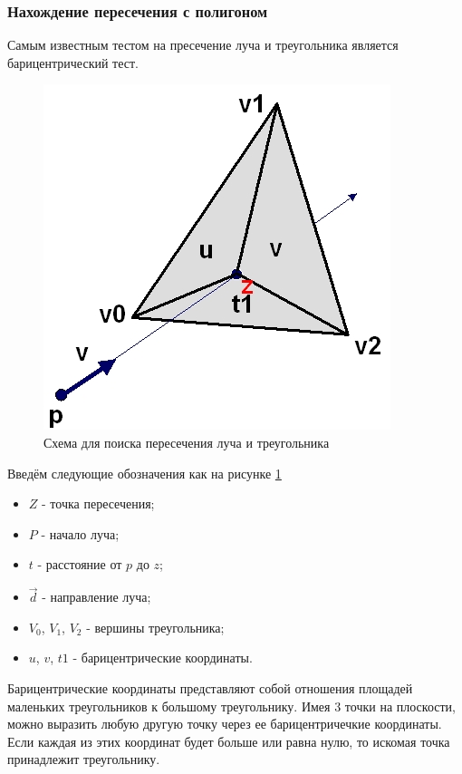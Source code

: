 \newpage	
\subsubsection{Нахождение пересечения с полигоном}

Самым известным тестом на пресечение луча и треугольника является барицентрический тест.

\begin{figure}[h]
	\centering
	\includegraphics{img/intersec.jpg}
	\caption{Схема для поиска пересечения луча и треугольника}
	\label{fig:intersec}
\end{figure}

Введём следующие обозначения как на рисунке \ref{fig:intersec}

\begin{itemize}
	\item $Z$ - точка пересечения;
	\item $P$ - начало луча;
	\item $t$ - расстояние от $p$ до $z$;
	\item $\vec{d}$ - направление луча;
	\item $V_{0}$, $V_{1}$, $V_{2}$ - вершины треугольника;
	\item $u$, $v$, $t1$ - барицентрические координаты.
\end{itemize}

Барицентрические координаты представляют собой отношения площадей маленьких треугольников к большому треугольнику. Имея 3 точки на плоскости, можно выразить любую другую точку через ее барицентричечкие координаты. Если каждая из этих координат будет больше или равна нулю, то искомая точка принадлежит треугольнику.\cite{intersec}
 
